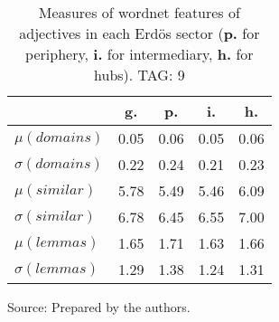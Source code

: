 \begin{table}[h!]
\begin{center}
	\caption{Measures of wordnet features of adjectives in each Erd\"os sector ({{\bf p.}} for periphery, {{\bf i.}} for intermediary, {{\bf h.}} for hubs). TAG: 9}\label{tab:wnas}
\begin{tabular}{| l || c | c | c | c |}\hline
 & {\bf g.} & {\bf p.} & {\bf i.} & {\bf h.} \\\hline\hline
$\mu(domains)$ & 0.05  & 0.06  & 0.05  & 0.06 \\
$\sigma(domains)$ & 0.22  & 0.24  & 0.21  & 0.23 \\\hline
$\mu(similar)$ & 5.78  & 5.49  & 5.46  & 6.09 \\
$\sigma(similar)$ & 6.78  & 6.45  & 6.55  & 7.00 \\\hline
$\mu(lemmas)$ & 1.65  & 1.71  & 1.63  & 1.66 \\
$\sigma(lemmas)$ & 1.29  & 1.38  & 1.24  & 1.31 \\\hline
\end{tabular}
\begin{flushleft}
		Source: Prepared by the authors.\
\end{flushleft}
\end{center}
\end{table}
